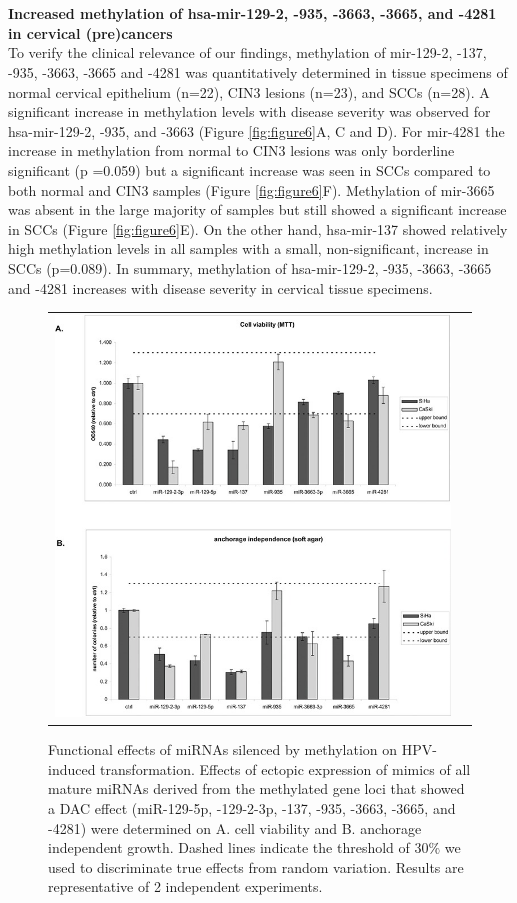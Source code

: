 \\
\\
\textbf{Increased methylation of hsa-mir-129-2, -935, -3663, -3665, and -4281 in cervical (pre)cancers}
\\
To verify the clinical relevance of our findings, methylation of mir-129-2, -137, -935, -3663, -3665 and -4281 was quantitatively determined in tissue specimens of normal cervical epithelium (n=22), CIN3 lesions (n=23), and SCCs (n=28). A significant increase in methylation levels with disease severity was observed for hsa-mir-129-2, -935, and -3663 (Figure \ref{fig:figure6}A, C and D). For mir-4281 the increase in methylation from normal to CIN3 lesions was only borderline significant (p =0.059) but a significant increase was seen in SCCs compared to both normal and CIN3 samples (Figure \ref{fig:figure6}F). Methylation of mir-3665 was absent in the large majority of samples but still showed a significant increase in SCCs (Figure \ref{fig:figure6}E). On the other hand, hsa-mir-137 showed relatively high methylation levels in all samples with a small, non-significant, increase in SCCs (p=0.089). 
In summary, methylation of hsa-mir-129-2, -935, -3663, -3665 and -4281 increases with disease severity in cervical tissue specimens. 
\begin{figure}[h!]
\centering
\begin{tabular}{cc} 
\includegraphics[scale=2.5]{Figure5.jpg}
\end{tabular}
\caption{Functional effects of miRNAs silenced by methylation on HPV-induced transformation. Effects of ectopic expression of mimics of all mature miRNAs derived from the methylated gene loci that showed a DAC effect (miR-129-5p, -129-2-3p, -137, -935, -3663, -3665, and -4281) were determined on A. cell viability and B. anchorage independent growth. Dashed lines indicate the threshold of 30$\%$ we used to discriminate true effects from random variation. Results are representative of 2 independent experiments.}
\label{fig:figure5}
\end{figure}

